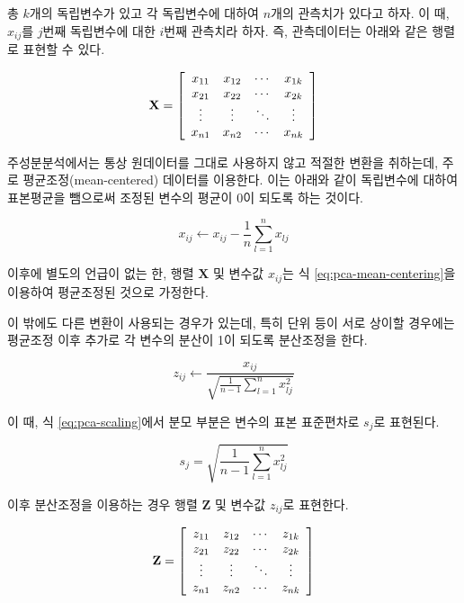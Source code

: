 \documentclass[
]{book}
\begin{document}
총 \(k\)개의 독립변수가 있고 각 독립변수에 대하여 \(n\)개의 관측치가 있다고 하자. 이 때, \(x_{ij}\)를 \(j\)번째 독립변수에 대한 \(i\)번째 관측치라 하자. 즉, 관측데이터는 아래와 같은 행렬로 표현할 수 있다.

\begin{equation*}
\mathbf{X} = \left[ \begin{array}{c c c c}
x_{11} & x_{12} & \cdots & x_{1k}\\
x_{21} & x_{22} & \cdots & x_{2k}\\
\vdots & \vdots & \ddots & \vdots \\
x_{n1} & x_{n2} & \cdots & x_{nk}
\end{array} \right]
\end{equation*}

주성분분석에서는 통상 원데이터를 그대로 사용하지 않고 적절한 변환을 취하는데, 주로 평균조정(mean-centered) 데이터를 이용한다. 이는 아래와 같이 독립변수에 대하여 표본평균을 뺌으로써 조정된 변수의 평균이 0이 되도록 하는 것이다.

\begin{equation}
x_{ij} \leftarrow x_{ij} - \frac{1}{n} \sum_{l = 1}^{n} x_{lj} \label{eq:pca-mean-centering}
\end{equation}

이후에 별도의 언급이 없는 한, 행렬 \(\mathbf{X}\) 및 변수값 \(x_{ij}\)는 식 \eqref{eq:pca-mean-centering}을 이용하여 평균조정된 것으로 가정한다.

이 밖에도 다른 변환이 사용되는 경우가 있는데, 특히 단위 등이 서로 상이할 경우에는 평균조정 이후 추가로 각 변수의 분산이 1이 되도록 분산조정을 한다.

\begin{equation*}
z_{ij} \leftarrow \frac{x_{ij}}{\sqrt{\frac{1}{n - 1} \sum_{l =1}^{n} x_{lj}^2}} \label{eq:pca-scaling}
\end{equation*}

이 때, 식 \eqref{eq:pca-scaling}에서 분모 부분은 변수의 표본 표준편차로 \(s_j\)로 표현된다.

\begin{equation*}
s_{j} = \sqrt{\frac{1}{n - 1} \sum_{l =1}^{n} x_{lj}^2}
\end{equation*}

이후 분산조정을 이용하는 경우 행렬 \(\mathbf{Z}\) 및 변수값 \(z_{ij}\)로 표현한다.

\begin{equation*}
\mathbf{Z} = \left[ \begin{array}{c c c c}
z_{11} & z_{12} & \cdots & z_{1k}\\
z_{21} & z_{22} & \cdots & z_{2k}\\
\vdots & \vdots & \ddots & \vdots \\
z_{n1} & z_{n2} & \cdots & z_{nk}
\end{array} \right]
\end{equation*}
\end{document}
